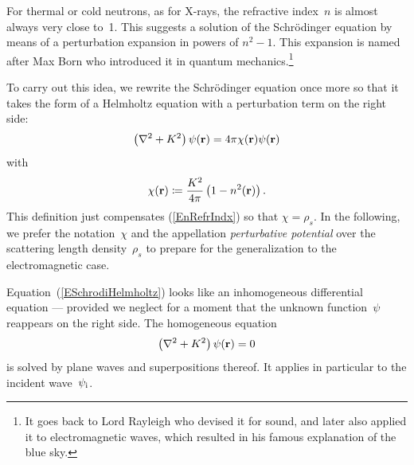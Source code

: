 For thermal or cold neutrons,
as for X-rays, the refractive index~$n$ is almost always
very close to~1.
This suggests a solution of the Schrödinger equation
by means of a perturbation expansion in powers of $n^2-1$.
This expansion is named after Max Born
who introduced it in quantum mechanics.\footnote
{It goes back to Lord Rayleigh
who devised it for sound,
and later also applied it to electromagnetic waves,
which resulted in his famous explanation of the blue sky.}

To carry out this idea, we rewrite the Schrödinger equation
once more so that it takes the form of a Helmholtz equation
%
with a perturbation term on the right side:
\begin{equation}\label{ESchrodiHelmholtz}
  \left(\mathbf{\nabla}^2+K^2\right)\psi(\mathbf{r})
  = 4\pi\chi(\mathbf{r})\psi(\mathbf{r})
\end{equation}
with
\begin{equation}\label{EChiDef}
  \chi(\mathbf{r}) \coloneqq  \frac{K^2}{4\pi}\left(1-n^2(\mathbf{r})\right).
\end{equation}
%
This definition just compensates (\ref{EnRefrIndx}) so that $\chi=\rho_s$.
In the following, we prefer the notation~$\chi$
and the appellation \textit{perturbative potential}
%
%
over the scattering length density~$\rho_s$
to prepare for the generalization to the electromagnetic case.

Equation~(\ref{ESchrodiHelmholtz}) looks
like an inhomogeneous differential equation ---
provided we neglect for a moment that the unknown function~$\psi$
reappears on the right side.
The homogeneous equation
\begin{equation}\label{EHelmholtzHomog}
  \left(\mathbf{\nabla}^2+K^2\right)\psi(\mathbf{r}) = 0
\end{equation}
is solved by plane waves and superpositions thereof.
It applies in particular to the incident wave~$\psi_{\text{i}}$.

